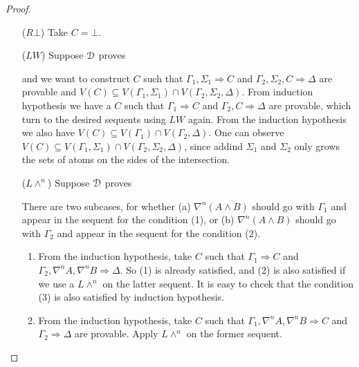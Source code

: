 \begin{proof}
\begin{enumerate}
	\item[($R \bot$)] Take $C = \bot$.
	
	\item[($LW$)] Suppose $\D$ proves
	\begin{prooftree}
  \end{prooftree}
  and we want to construct $C$ such that $\Gamma_1, \Sigma_1 \Rightarrow C$ and $\Gamma_2, \Sigma_2, C \Rightarrow \Delta$ are provable and $V(C) \subseteq V(\Gamma_1, \Sigma_1) \cap V(\Gamma_2, \Sigma_2,\Delta)$. From induction hypothesis we have a $C$ such that $\Gamma_1 \Rightarrow C$ and $\Gamma_2 , C \Rightarrow \Delta$ are provable, which turn to the desired sequents using $LW$ again. From the induction hypothesis we also have $V(C) \subseteq V(\Gamma_1) \cap V(\Gamma_2, \Delta)$. One can observe $V(C) \subseteq V(\Gamma_1, \Sigma_1) \cap V(\Gamma_2, \Sigma_2, \Delta)$, since addind $\Sigma_1$ and $\Sigma_2$ only grows the sets of atoms on the sides of the intersection.

	\item[($L \wedge ^n$)] Suppose $\D$ proves
  \begin{prooftree}
  \end{prooftree}
  There are two subcases, for whether (a) $\nabla^n (A \wedge B)$ should go with $\Gamma_1$ and appear in the sequent for the condition (1), or (b) $\nabla^n (A \wedge B)$  should go with $\Gamma_2$ and appear in the sequent for the condition (2).
	\begin{enumerate}
		\item From the induction hypothesis, take $C$ such that $\Gamma_1 \Rightarrow C$ and $\Gamma_2, \nabla^n A, \nabla^n B \Rightarrow \Delta$. So (1) is already satisfied, and (2) is also satisfied if we use a $L \wedge ^n$ on the latter sequent. It is easy to chcek that the condition (3) is also satisfied by induction hypothesis.

		\item From the induction hypothesis, take $C$ such that $\Gamma_1 , \nabla^n A, \nabla^n B \Rightarrow C$ and $\Gamma_2 \Rightarrow \Delta$ are provable. Apply $L \wedge ^n$ on the former sequent.
	\end{enumerate}


\end{enumerate}
\end{proof}

